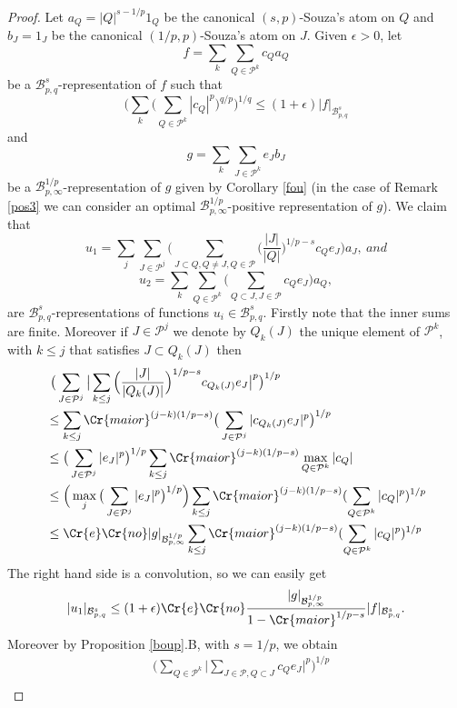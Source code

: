 \documentclass{amsart}
\theoremstyle{definition}
\newcommand{\Crr}[1]{\Cr{#1}}
\begin{document}
\begin{proof} Let  $a_Q=|Q|^{s-1/p}1_Q$ be  the canonical $(s,p)$-Souza's atom on $Q$ and $b_J=1_J$ be  the canonical $(1/p,p)$-Souza's atom on $J$. Given $\epsilon > 0$, let 
$$f = \sum_k \sum_{Q\in \mathcal{P}^k} c_Q a_Q$$
be  a $\mathcal{B}^s_{p,q}$-representation of $f$ such that 
$$ \Big(  \sum_k \big(\sum_{Q\in \mathcal{P}^k} |c_Q|^p\big)^{q/p} \Big)^{1/q} \leq (1+\epsilon)|f|_{\mathcal{B}^s_{p,q}}$$
and
$$g =\sum_k  \sum_{J\in \mathcal{P}^k} e_J b_J$$
be  a $\mathcal{B}^{1/p}_{p,\infty}$-representation of $g$ given by Corollary \ref{fou} (in the case of Remark \ref{pos3} we can consider an optimal $\mathcal{B}^{1/p}_{p,\infty}$-positive representation of $g$). We claim that 
$$u_1 =\sum_j  \sum_{J \in \mathcal{P}^j} \big(\sum_{J\subset Q, Q\neq J,Q\in \mathcal{P}} \big( \frac{|J|}{|Q|}\big)^{1/p-s}  c_Q e_J  \big)  a_J, \ and $$
$$u_2 = \sum_k \sum_{Q \in \mathcal{P}^k} \big( \sum_{Q\subset J,  J\in \mathcal{P} } c_Q e_J \big)  a_Q,$$
are $\mathcal{B}^s_{p,q}$-representations of functions $u_i \in \mathcal{B}^s_{p,q}$. Firstly note that the inner sums are finite. Moreover  if $J\in \mathcal{P}^j$ we denote by 
$Q_k(J)$ the unique element  of $\mathcal{P}^k$, with $k\leq j$ that satisfies  $J \subset Q_k(J)$ then 
\begin{align}& \ \big( \sum_{J \in \mathcal{P}^j } \big|\sum_{k \leq j}  \Big( \frac{|J|}{|Q_k(J)|}\Big)^{1/p-s}  c_{Q_k(J)} e_J\big|^p \big)^{1/p} \nonumber  \\
&\leq  \sum_{k \leq j} \Crr{maior}^{(j-k)(1/p-s)}  \big( \sum_{J \in \mathcal{P}^j }| c_{Q_k(J)} e_J|^p \big)^{1/p} \nonumber  \\
&\leq \big( \sum_{J \in \mathcal{P}^j }|e_J|^p \big)^{1/p}  \sum_{k \leq j} \Crr{maior}^{(j-k)(1/p-s)}  \max_{Q\in \mathcal{P}^k}  |c_Q|\nonumber  \\
&\leq \Big( \max_j \big( \sum_{J \in \mathcal{P}^j }|e_J|^p \big)^{1/p} \Big) \sum_{k \leq j} \Crr{maior}^{(j-k)(1/p-s)}  (\sum_{Q\in \mathcal{P}^k}  |c_Q|^p)^{1/p} \nonumber  \\
&\leq \Crr{e}\Crr{no}  |g|_{\mathcal{B}^{1/p}_{p,\infty}} \sum_{k \leq j} \Crr{maior}^{(j-k)(1/p-s)}  (\sum_{Q\in \mathcal{P}^k}  |c_Q|^p)^{1/p} \nonumber  
\end{align} 
The right hand side is a convolution, so we can easily get 
$$ |u_1|_{\mathcal{B}^s_{p,q}} \leq (1+\epsilon) \Crr{e}\Crr{no} \frac{|g|_{\mathcal{B}^{1/p}_{p,\infty}} }{1-\Crr{maior}^{1/p-s}}     |f|_{\mathcal{B}^s_{p,q}}.$$
Moreover by Proposition \ref{boup}.B, with $s=1/p$, we obtain
\begin{align}& \Big( \sum_{Q \in \mathcal{P}^k} \big| \sum_{J\in \mathcal{P}, Q\subset J} c_Q e_J \big|^p  \Big)^{1/p} \nonumber  \\

\end{align}
\end{proof}
\end{document}
